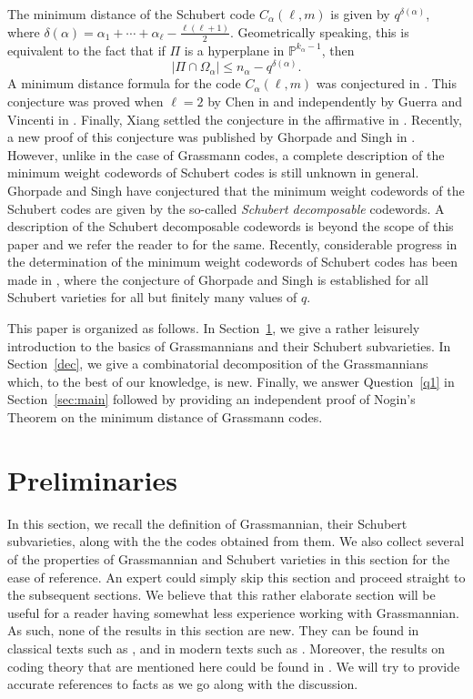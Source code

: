 \documentclass[10pt,a4paper,oneside]{amsproc}
\def\a{{\alpha}}
\def\PP{{\mathbb P}}
\begin{document}
The minimum distance of the Schubert code $C_\a(\ell, m)$ is given 
by $q^{\delta(\a)}$, where 
$\delta(\a) = \a_1 + \cdots + \a_\ell - \frac{\ell(\ell+1)}{2}$. 
Geometrically speaking, this is equivalent to the fact that if 
$\Pi$ is a hyperplane in $\PP^{k_\a - 1}$, then 
\begin{equation}\label{minsch}
|\Pi \cap \Omega_\a| \le n_\a - q^{\delta(\a)}.
\end{equation}
A minimum distance formula for the code $C_\a(\ell, m)$ was 
conjectured in \cite{GL}. This conjecture was proved when $\ell = 2$ 
by Chen in \cite[Theorem 2.1]{C} and independently by Guerra and 
Vincenti in \cite[Theorem 1.2]{GV}. Finally, Xiang settled the 
conjecture in the affirmative in \cite[Theorem 2]{X}. Recently, 
a new proof of this conjecture was published by Ghorpade and Singh 
in \cite[Theorem 3.6]{GS}. However, unlike in the case of Grassmann 
codes, a complete description of the minimum weight codewords of 
Schubert codes is still unknown in general. Ghorpade and Singh 
\cite[Conjecture 5.6]{GS} have conjectured that the minimum weight 
codewords of the Schubert codes are given by the so-called 
\emph{Schubert decomposable} codewords. A description of the 
Schubert decomposable codewords is beyond the scope of this paper 
and we refer the reader to \cite{GS} for the same. Recently, 
considerable progress in the determination of the minimum weight 
codewords of Schubert codes has been made in \cite{DDJ}, where 
the conjecture of Ghorpade and Singh is established for all 
Schubert varieties for all but finitely many values of $q$.

This paper is organized as follows. In Section~\ref{sec:prel}, 
we give a rather leisurely introduction to the basics of 
Grassmannians and their Schubert subvarieties. In 
Section~\ref{dec}, we give a combinatorial decomposition of the 
Grassmannians which, to the best of our knowledge, is new. 
Finally, we answer Question~\ref{q1} in Section~\ref{sec:main} 
followed by providing an independent proof of Nogin's Theorem on 
the minimum distance of Grassmann codes.

\section{Preliminaries}\label{sec:prel}
In this section, we recall the definition of Grassmannian, their Schubert subvarieties, along with the the codes obtained from them. We also collect several of the properties of Grassmannian and Schubert varieties in this section for the ease of reference. An expert could simply skip this section and proceed straight to the subsequent sections. We believe that this rather elaborate section will be useful for a reader having somewhat less experience working with Grassmannian. As such, none of the results in this section are new. They can be found in classical texts such as \cite{A, HP, M}, and in modern texts such as \cite{LB}. Moreover, the results on coding theory that are mentioned here could be found in \cite{C, GL, GPP, GS, HJR, N, X}. We will try to provide accurate references to facts as we go along with the discussion.  
\end{document}
